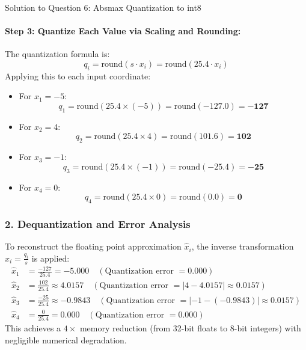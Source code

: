 \documentclass[11pt,a4paper]{article}
\begin{document}
\begin{solutionbox}{Solution to Question 6: Absmax Quantization to int8}
\paragraph{Step 3: Quantize Each Value via Scaling and Rounding:}
The quantization formula is:
\begin{equation}
    q_i = \text{round}(s \cdot x_i) = \text{round}(25.4 \cdot x_i)
\end{equation}
Applying this to each input coordinate:
\begin{itemize}[leftmargin=2em]
    \item For $x_1 = -5$:
    \begin{equation*}
        q_1 = \text{round}(25.4 \times (-5)) = \text{round}(-127.0) = \mathbf{-127}
    \end{equation*}
    \item For $x_2 = 4$:
    \begin{equation*}
        q_2 = \text{round}(25.4 \times 4) = \text{round}(101.6) = \mathbf{102}
    \end{equation*}
    \item For $x_3 = -1$:
    \begin{equation*}
        q_3 = \text{round}(25.4 \times (-1)) = \text{round}(-25.4) = \mathbf{-25}
    \end{equation*}
    \item For $x_4 = 0$:
    \begin{equation*}
        q_4 = \text{round}(25.4 \times 0) = \text{round}(0.0) = \mathbf{0}
    \end{equation*}
\end{itemize}

\subsubsection*{2. Dequantization and Error Analysis}
To reconstruct the floating point approximation $\hat{x}_i$, the inverse transformation $\hat{x}_i = \frac{q_i}{s}$ is applied:
\begin{align*}
    \hat{x}_1 &= \frac{-127}{25.4} = -5.000 \quad (\text{Quantization error } = 0.000) \\
    \hat{x}_2 &= \frac{102}{25.4} \approx 4.0157 \quad (\text{Quantization error } = |4 - 4.0157| \approx 0.0157) \\
    \hat{x}_3 &= \frac{-25}{25.4} \approx -0.9843 \quad (\text{Quantization error } = |-1 - (-0.9843)| \approx 0.0157) \\
    \hat{x}_4 &= \frac{0}{25.4} = 0.000 \quad (\text{Quantization error } = 0.000)
\end{align*}
This achieves a $4\times$ memory reduction (from 32-bit floats to 8-bit integers) with negligible numerical degradation.
\end{solutionbox}
\end{document}
